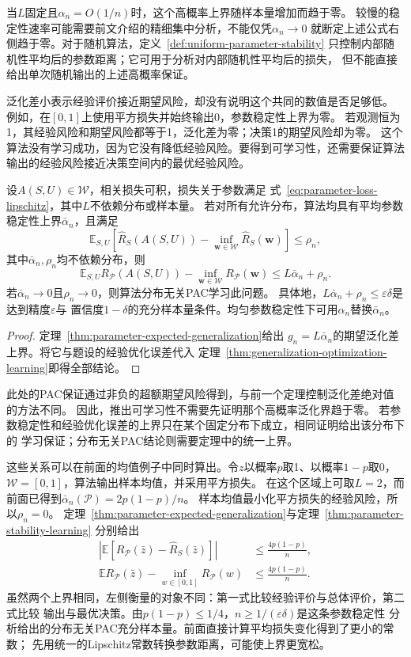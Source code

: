 当$L$固定且$\alpha_n=O(1/n)$时，这个高概率上界随样本量增加而趋于零。
较慢的稳定性速率可能需要前文介绍的精细集中分析，不能仅凭$\alpha_n\to0$
就断定上述公式右侧趋于零。对于随机算法，定义~\ref{def:uniform-parameter-stability}
只控制内部随机性平均后的参数距离；它可用于分析对内部随机性平均后的损失，
但不能直接给出单次随机输出的上述高概率保证。

泛化差小表示经验评价接近期望风险，却没有说明这个共同的数值是否足够低。
例如，在$[0,1]$上使用平方损失并始终输出0，参数稳定性上界为零。
若观测恒为1，其经验风险和期望风险都等于1，泛化差为零；决策1的期望风险却为零。
这个算法没有学习成功，因为它没有降低经验风险。要得到可学习性，还需要保证算法
输出的经验风险接近决策空间内的最优经验风险。

\begin{theorem}[参数稳定性与可学习性]
\label{thm:parameter-stability-learning}
设$A(S,U)\in\mathcal W$，相关损失可积，损失关于参数满足
式~\eqref{eq:parameter-loss-lipschitz}，其中$L$不依赖分布或样本量。
若对所有允许分布，算法均具有平均参数稳定性上界$\bar\alpha_n$，且满足
\[
 \mathbb E_{S,U}\!\left[\hat R_S(A(S,U))-
 \inf_{\bm w\in\mathcal W}\hat R_S(\bm w)\right]\leq\rho_n,
\]
其中$\bar\alpha_n,\rho_n$均不依赖分布，则
\[
 \mathbb E_{S,U}R_{\mathcal P}(A(S,U))-
 \inf_{\bm w\in\mathcal W}R_{\mathcal P}(\bm w)
 \leq L\bar\alpha_n+\rho_n.
\]
若$\bar\alpha_n\to0$且$\rho_n\to0$，则算法分布无关PAC学习此问题。
具体地，$L\bar\alpha_n+\rho_n\leq\varepsilon\delta$是达到精度$\varepsilon$与
置信度$1-\delta$的充分样本量条件。均匀参数稳定性下可用$\alpha_n$替换$\bar\alpha_n$。
\end{theorem}
\begin{proof}
定理~\ref{thm:parameter-expected-generalization}给出
$g_n=L\bar\alpha_n$的期望泛化差上界。将它与题设的经验优化误差代入
定理~\ref{thm:generalization-optimization-learning}即得全部结论。
\end{proof}

此处的PAC保证通过非负的超额期望风险得到，与前一个定理控制泛化差绝对值的方法不同。
因此，推出可学习性不需要先证明那个高概率泛化界趋于零。
若参数稳定性和经验优化误差的上界只在某个固定分布下成立，相同证明给出该分布下的
学习保证；分布无关PAC结论则需要定理中的统一上界。

这些关系可以在前面的均值例子中同时算出。令$z$以概率$p$取1、以概率$1-p$取0，
$\mathcal W=[0,1]$，算法输出样本均值，并采用平方损失。
在这个区域上可取$L=2$，而前面已得到$\bar\alpha_n(\mathcal P)=2p(1-p)/n$。
样本均值最小化平方损失的经验风险，所以$\rho_n=0$。
定理~\ref{thm:parameter-expected-generalization}与定理~\ref{thm:parameter-stability-learning}
分别给出
\begin{align*}
 \left|\mathbb E[R_{\mathcal P}(\bar z)-\hat R_S(\bar z)]\right|
 &\leq\frac{4p(1-p)}n,\\
 \mathbb E R_{\mathcal P}(\bar z)-\inf_{w\in[0,1]}R_{\mathcal P}(w)
 &\leq\frac{4p(1-p)}n.
\end{align*}
虽然两个上界相同，左侧衡量的对象不同：第一式比较经验评价与总体评价，第二式比较
输出与最优决策。由$p(1-p)\leq1/4$，$n\geq1/(\varepsilon\delta)$是这条参数稳定性
分析给出的分布无关PAC充分样本量。前面直接计算平均损失变化得到了更小的常数；
先用统一的Lipschitz常数转换参数距离，可能使上界更宽松。

